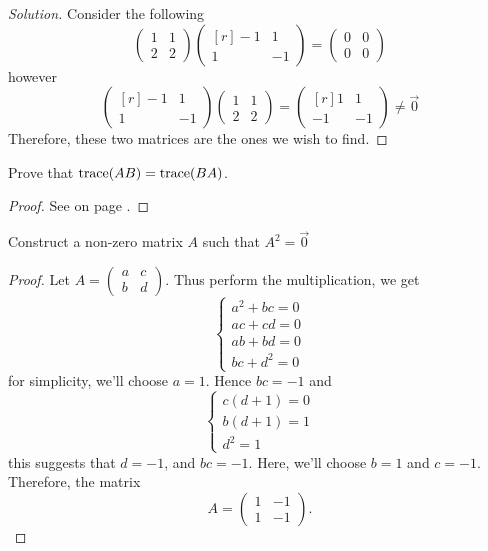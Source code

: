 \begin{proof}[Solution]
  Consider the following
  \[
    \begin{pmatrix}
      1&1\\2&2
    \end{pmatrix}
    \begin{pmatrix*}[r]
      -1 &1\\ 1&-1
    \end{pmatrix*}=
    \begin{pmatrix}
      0&0\\0&0
    \end{pmatrix}
  \]
  however
  \[
    \begin{pmatrix*}[r]
      -1 &1\\ 1&-1
    \end{pmatrix*}
    \begin{pmatrix}
      1&1\\2&2
    \end{pmatrix}=
    \begin{pmatrix*}[r]
      1&1\\-1&-1
    \end{pmatrix*}\neq \vec{0}
  \]
  Therefore, these two matrices are the ones we wish to find.
\end{proof}
\begin{exercise}
  Prove that $\operatorname{trace}(AB)=\operatorname{trace}(BA)$.
\end{exercise}
\begin{proof}
  See on page \pageref{_trace}.
\end{proof}
\begin{exercise}
  Construct a non-zero matrix $A$ such that $A^2=\vec{0}$
\end{exercise}
\begin{proof}
  Let $A=\begin{pmatrix} a&c\\b&d \end{pmatrix}$. Thus
  perform the multiplication, we get
  \[
    \begin{cases}
      a^2 + bc=0\\
      ac+cd=0\\
      ab+bd=0\\
      bc+d^2=0
    \end{cases}
  \]
  for simplicity, we'll choose $a=1$. Hence $bc=-1$ and
  \[
    \begin{cases}
      c(d+1)=0\\
      b(d+1)=1\\
      d^2=1
    \end{cases}
  \]
  this suggests that $d=-1$, and $bc=-1$. Here, we'll choose $b=1$
  and $c=-1$. Therefore, the matrix
  \[ A=\begin{pmatrix}1&-1\\1&-1\end{pmatrix}. \]
\end{proof}
